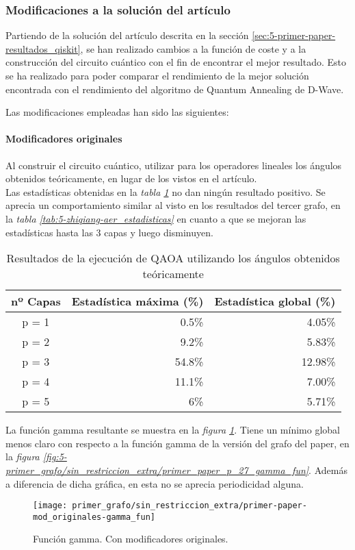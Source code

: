 \documentclass{article}
\begin{document}
\subsubsection{Modificaciones a la solución del artículo}
Partiendo de la solución del artículo descrita en la sección \ref{sec:5-primer-paper-resultados_qiskit}, se han realizado cambios a la función de coste y a la construcción del circuito cuántico con el fin de encontrar el mejor resultado. Esto se ha realizado para poder comparar el rendimiento de la mejor solución encontrada con el rendimiento del algoritmo de Quantum Annealing de D-Wave.

Las modificaciones empleadas han sido las siguientes:

\paragraph{Modificadores originales}
Al construir el circuito cuántico, utilizar para los operadores lineales los ángulos obtenidos teóricamente, en lugar de los vistos en el artículo. \\
Las estadísticas obtenidas en la \textit{tabla \ref{tab:5-primer-mod_originales-aer_estadisticas} } no dan ningún resultado positivo. Se aprecia un comportamiento similar al visto en los resultados del tercer grafo, en la \textit{tabla \ref{tab:5-zhiqiang-aer_estadisticas} } en cuanto a que se mejoran las estadísticas hasta las 3 capas y luego disminuyen.
\begin{table}[htbp]
  \centering
  \begin{tabular}{|c|r|r|}
    \hline
    \textbf{nº Capas} & \textbf{Estadística máxima (\%)} & \textbf{Estadística global (\%)} \\ \hline
    p = 1 &  0.5\% &  4.05\% \\ \hline
    p = 2 &  9.2\% &  5.83\% \\ \hline
    p = 3 & 54.8\% & 12.98\% \\ \hline
    p = 4 & 11.1\% &  7.00\% \\ \hline
    p = 5 &    6\% &  5.71\% \\ \hline
  \end{tabular}
  \caption{Resultados de la ejecución de QAOA utilizando los ángulos obtenidos teóricamente}
  \label{tab:5-primer-mod_originales-aer_estadisticas}
\end{table}

La función gamma resultante se muestra en la \textit{figura \ref{fig:5-primer-mod_originales-gamma_fun}}. Tiene un mínimo global menos claro con respecto a la función gamma de la versión del grafo del paper, en la \textit{figura \ref{fig:5-primer_grafo/sin_restriccion_extra/primer_paper_p_27_gamma_fun}}. Además a diferencia de dicha gráfica, en esta no se aprecia periodicidad alguna.
\begin{figure}[htbp]
  \centering
  \texttt{[image: primer\_grafo/sin\_restriccion\_extra/primer-paper-mod\_originales-gamma\_fun]}
  \caption{Función gamma. Con modificadores originales.}
  \label{fig:5-primer-mod_originales-gamma_fun}
\end{figure}
\end{document}
